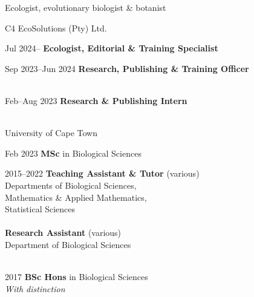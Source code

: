 \documentclass[12pt]{article}
\begin{document}



\bigskip

\begin{center}
  Ecologist, evolutionary biologist \& botanist
\end{center}

C4 EcoSolutions (Pty) Ltd.

Jul 2024-- \hspace{5.15em} \textbf{Ecologist, Editorial \& Training Specialist}

Sep 2023--Jun 2024 \hspace{0.5em} \textbf{Research, Publishing \& Training Officer} \\
\

Feb--Aug 2023 \hspace{2.75em} \textbf{Research \& Publishing Intern} \\
\

University of Cape Town

Feb 2023   \hspace{5.1em} \textbf{MSc} in Biological Sciences

2015--2022 \hspace{1.5em} \textbf{Teaching Assistant \& Tutor} (various) \\
           \hspace{6.75em} Departments of Biological Sciences, \\
                            \hspace{13em} Mathematics \& Applied Mathematics, \\
                            \hspace{13em} Statistical Sciences \\
           \ \\
           \hspace{6.75em} \textbf{Research Assistant} (various) \\
           \hspace{6.75em} Department of Biological Sciences \\
\

2017       \hspace{4.25em} \textbf{BSc Hons} in Biological Sciences \\
           \hspace{6.75em} \textit{With distinction} \\
\
\end{document}
